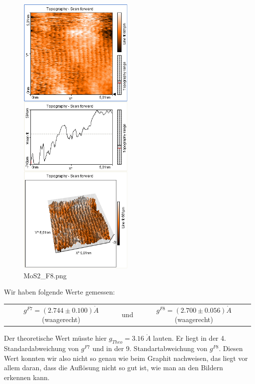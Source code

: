 \begin{figure}[H]
	\centering \includegraphics*[viewport= 5 528 322 825 , width = 0.5\textwidth]{messwerte/Freitag/MoS2_F8.png}
	\caption{MoS2\_F8.png}
	\end{figure}
	
Wir haben folgende Werte gemessen:

\begin{tabular}{c c c}
	$g^{F7} = (2.744 \pm 0.100) \mathring{A}$ (waagerecht) & und & $g^{F8} = (2.700 \pm 0.056) \mathring{A}$ (waagerecht)
\end{tabular}	
	
Der theoretische Wert müsste hier $g_{Theo} = 3.16\ \mathring A$ lauten. Er liegt in der 4. Standardabweichung von $g^{F7}$ und in der 9. Standartabweichung von $g^{F8}$. Diesen Wert konnten wir also nicht so genau wie beim Graphit nachweisen, das liegt vor allem daran, dass die Auflösung nicht so gut ist, wie man an den Bildern erkennen kann.
	
	
	
	
	
	
	

